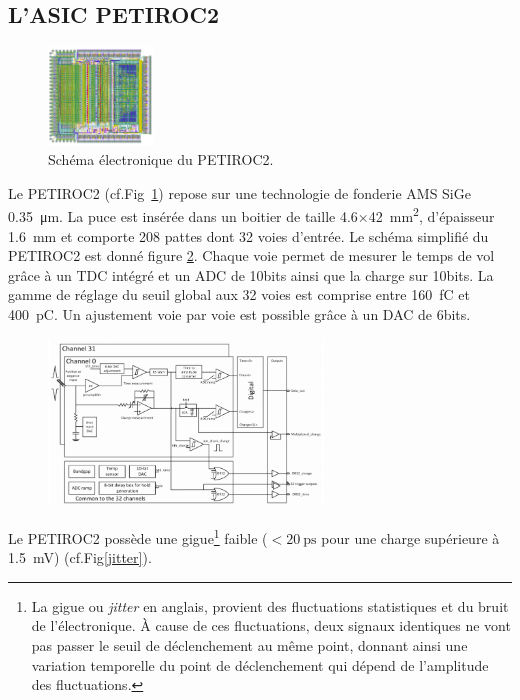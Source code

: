 \subsection{L'ASIC PETIROC2}

\begin{figure}
	\centering
	\vspace*{-1cm}
	\includegraphics[width=0.25\textwidth]{ELE/PETIROC.png}
	\caption{Schéma électronique du PETIROC2.}
	\label{PETIROC2}
\end{figure}

Le PETIROC2 (cf.Fig~\ref{PETIROC2}) repose sur une technologie de fonderie AMS SiGe \SI{0.35}{\micro\meter}. La puce est insérée dans un boitier de taille \num{4.6}$\times$\SI{42}{\square\milli\meter}, d'épaisseur \SI{1.6}{\milli\meter} et comporte \num{208} pattes dont \num{32} voies d'entrée. Le schéma simplifié du PETIROC2 est donné figure \ref{SchemePETIROC}. Chaque voie permet de mesurer le temps de vol grâce à un TDC intégré et un ADC de \num{10}bits ainsi que la charge sur \num{10}bits. La gamme de réglage du seuil global aux \num{32} voies est comprise entre \SI{160}{\femto\coulomb} et \SI{400}{\pico\coulomb}. Un ajustement voie par voie est possible grâce à un DAC de \num{6}bits. 

\begin{figure}[ht!]
	\centering
	\includegraphics[width=0.65\textwidth]{ELE/Scheme.png}
	\label{SchemePETIROC}
\end{figure}

Le PETIROC2 possède une gigue\footnote{La gigue ou \textit{jitter} en anglais, provient des fluctuations statistiques et du bruit de l'électronique. À cause de ces fluctuations, deux signaux identiques ne vont pas passer le seuil de déclenchement au même point, donnant ainsi une variation temporelle du point de déclenchement qui dépend de l'amplitude des fluctuations.} faible ($<\SI{20}{\pico\second}$ pour une charge supérieure à \SI{1.5}{\milli\volt}) (cf.Fig\ref{jitter}).

